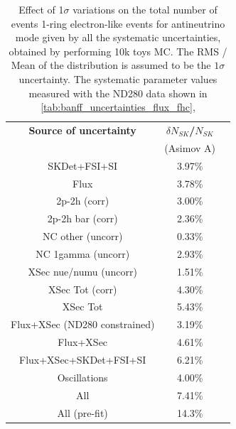 \begin{table}[htb]
\centering
\begin{tabular}{| c | c | c |}
\hline
  {\bf Source of uncertainty}    & \multicolumn{1}{c|}{{\bf ${\delta}N_{SK}$/$N_{SK}$}}\\
                                 & \multicolumn{1}{c|}{(Asimov A)}\\

\hline
\hline  SKDet+FSI+SI                   & 3.97\%                        \\
\hline
  Flux                           & 3.78\%                        \\
\hline
\hline
  2p-2h (corr)                     & 3.00\%                        \\
  2p-2h bar (corr)                  & 2.36\%                        \\
  NC other (uncorr)              & 0.33\%                        \\
  NC 1gamma (uncorr)             & 2.93\%                        \\
  XSec nue/numu (uncorr)                 & 1.51\%                        \\
\hline
  XSec Tot (corr)                  & 4.30\%                        \\
  XSec Tot                       & 5.43\%                        \\
\hline
\hline
  Flux+XSec (ND280 constrained)                      & 3.19\%                        \\
  Flux+XSec                      & 4.61\%                        \\
\hline
  Flux+XSec+SKDet+FSI+SI         & 6.21\%                        \\
\hline
\hline
  Oscillations                   & 4.00\%                        \\
\hline
\hline
  All                            & 7.41\%                        \\
      All (pre-fit) 		& 14.3\%				\\
\hline
\hline
\end{tabular}
\caption{
 Effect of 1$\sigma$ variations on the total number of events 1-ring electron-like events for antineutrino mode
 given by all the systematic uncertainties, obtained by performing 10k toys MC.
The RMS / Mean of the distribution is assumed to be the $1\sigma$ uncertainty.
The systematic parameter values measured with the ND280 data 
shown in 
\cref{tab:banff_uncertainties_flux_fhc},
}
\end{table}
